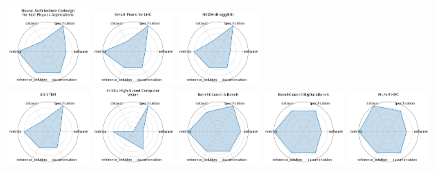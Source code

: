 \begin{figure}[ht!]
\includegraphics[width=0.1900\textwidth]{images/neural_architecture_codesign_for_fast_physics_applications_radar.pdf}
\includegraphics[width=0.1900\textwidth]{images/smart_pixels_for_lhc_radar.pdf}
\includegraphics[width=0.1900\textwidth]{images/hedm_braggnn_radar.pdf}
\\[1ex]
\includegraphics[width=0.1900\textwidth]{images/d-stem_radar.pdf}
\includegraphics[width=0.1900\textwidth]{images/in-situ_high-speed_computer_vision_radar.pdf}
\includegraphics[width=0.1900\textwidth]{images/benchcouncil_aibench_radar.pdf}
\includegraphics[width=0.1900\textwidth]{images/benchcouncil_bigdatabench_radar.pdf}
\includegraphics[width=0.1900\textwidth]{images/mlperf_hpc_radar.pdf}

\end{figure}
